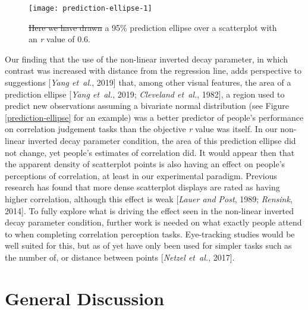 \documentclass[preprint, 3p,
authoryear]{elsarticle} %
\newcommand{\ldiffentity}[1]{#1}
\providecommand{\DIFaddtex}[1]{{\protect\color{blue}\uwave{#1}}} %
\providecommand{\DIFdeltex}[1]{{\protect\color{red}\sout{#1}}}                      %
\providecommand{\DIFaddFL}[1]{\DIFadd{#1}} %
\providecommand{\DIFdelFL}[1]{\DIFdel{#1}} %
\providecommand{\DIFaddbeginFL}{} %
\providecommand{\DIFaddendFL}{} %
\providecommand{\DIFdelbeginFL}{} %
\providecommand{\DIFdelendFL}{} %
\providecommand{\DIFadd}[1]{\texorpdfstring{\DIFaddtex{#1}}{#1}} %
\providecommand{\DIFdel}[1]{\texorpdfstring{\DIFdeltex{#1}}{}} %
\newcommand{\DIFscaledelfig}{0.5}
\newlength{\DIFdelgraphicswidth} %
\newlength{\DIFdelgraphicsheight} %
\newcommand{\DIFaddincludegraphics}[2][]{{\color{blue}\fbox{\DIFOincludegraphics[#1]{#2}}}} %
\newcommand{\DIFdelincludegraphics}[2][]{%
\sbox{\DIFdelgraphicsbox}{\DIFOincludegraphics[#1]{#2}}%
\settoboxwidth{\DIFdelgraphicswidth}{\DIFdelgraphicsbox} %
\settoboxtotalheight{\DIFdelgraphicsheight}{\DIFdelgraphicsbox} %
\scalebox{\DIFscaledelfig}{%
\parbox[b]{\DIFdelgraphicswidth}{\usebox{\DIFdelgraphicsbox}\\[-\baselineskip] \rule{\DIFdelgraphicswidth}{0em}}\llap{\resizebox{\DIFdelgraphicswidth}{\DIFdelgraphicsheight}{%
\setlength{\unitlength}{\DIFdelgraphicswidth}%
\begin{picture}(1,1)%
\thicklines\linethickness{2pt} %
{\color[rgb]{1,0,0}\put(0,0){\framebox(1,1){}}}%
{\color[rgb]{1,0,0}\put(0,0){\line( 1,1){1}}}%
{\color[rgb]{1,0,0}\put(0,1){\line(1,-1){1}}}%
\end{picture}%
}\hspace*{3pt}}} %
} %
\DeclareRobustCommand{\DIFaddbeginFL}{\DIFOaddbeginFL \let\includegraphics\DIFaddincludegraphics} %
\DeclareRobustCommand{\DIFaddendFL}{\DIFOaddendFL \let\includegraphics\DIFOincludegraphics} %
\DeclareRobustCommand{\DIFdelbeginFL}{\DIFOdelbeginFL \let\includegraphics\DIFdelincludegraphics} %
\DeclareRobustCommand{\DIFdelendFL}{\DIFOaddendFL \let\includegraphics\DIFOincludegraphics} %
\begin{document}
\begin{figure}

\DIFdelbeginFL %
\DIFdelendFL \DIFaddbeginFL \texttt{[image: prediction-ellipse-1]} \DIFaddendFL \hfill{}

\caption{\label{prediction-ellipse}\DIFdelbeginFL \DIFdelFL{Here we have drawn }\DIFdelendFL \DIFaddbeginFL \DIFaddFL{The above plot shows }\DIFaddendFL a 95\% prediction ellipse over a scatterplot with an \textit{r} value of 0.6.}\label{fig:prediction-ellipse}
\end{figure}

Our finding that the use of the non-linear inverted decay parameter, in
which contrast was increased with distance from the regression line,
adds perspective to suggestions [\ldiffentity{\textit{Yang et~al.}, \ldiffentity{2019}}] that, among other
visual features, the area of a prediction ellipse
[\ldiffentity{\textit{Yang et~al.}, \ldiffentity{2019}}; \ldiffentity{\textit{Cleveland et~al.}, \ldiffentity{1982}}], a region used to predict new
observations assuming a bivariate normal distribution (see Figure
\ref{prediction-ellipse} for an example) was a better predictor of
people's performance on correlation judgement tasks than the objective
\emph{r} value was itself. In our non-linear inverted decay parameter
condition, the area of this prediction ellipse did not change, yet
people's estimates of correlation did. It would appear then that the
apparent density of scatterplot points is also having an effect on
people's perceptions of correlation, at least in our experimental
paradigm. Previous research has found that more dense scatterplot
displays are rated as having higher correlation, although this effect is
weak [\ldiffentity{\textit{Lauer and Post}, \ldiffentity{1989}}; \ldiffentity{\textit{Rensink}, \ldiffentity{2014}}]. To fully explore what is driving
the effect seen in the non-linear inverted decay parameter condition,
further work is needed on what exactly people attend to when completing
correlation perception tasks. Eye-tracking studies would be well suited
for this, but as of yet have only been used for simpler tasks such as
the number of, or distance between points [\ldiffentity{\textit{Netzel et~al.}, \ldiffentity{2017}}].

\hypertarget{general-discussion}{%
\section{General Discussion}\label{general-discussion}}
\end{document}
